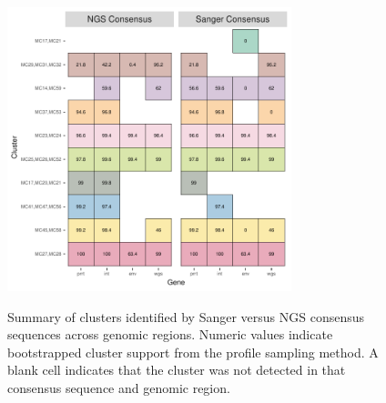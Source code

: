 \documentclass[letterpaper]{article}
\begin{document}
\newpage

\begin{figure}[p!]
	\caption{Summary of clusters identified by Sanger versus NGS consensus sequences across genomic regions. Numeric values indicate bootstrapped cluster support from the profile sampling method. A blank cell indicates that the cluster was not detected in that consensus sequence and genomic region.}
	\centering
	\includegraphics[width=3.25in]{Figure6}
	\label{fig6}
\end{figure}
\end{document}
